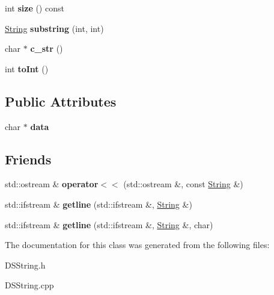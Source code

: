 \begin{DoxyCompactItemize}
\item 
int {\bfseries size} () const \hypertarget{classString_a6f35d53ffdc2ff4336dcb775d5d636df}{}\label{classString_a6f35d53ffdc2ff4336dcb775d5d636df}

\item 
\hyperlink{classString}{String} {\bfseries substring} (int, int)\hypertarget{classString_a0f6fb19e6af4f970864c098319368b4e}{}\label{classString_a0f6fb19e6af4f970864c098319368b4e}

\item 
char $\ast$ {\bfseries c\+\_\+str} ()\hypertarget{classString_aefb74cf401b56191337867e2780c5286}{}\label{classString_aefb74cf401b56191337867e2780c5286}

\item 
int {\bfseries to\+Int} ()\hypertarget{classString_a77ce12d84388f4e13f79ba806dd0e590}{}\label{classString_a77ce12d84388f4e13f79ba806dd0e590}

\end{DoxyCompactItemize}
\subsection*{Public Attributes}
\begin{DoxyCompactItemize}
\item 
char $\ast$ {\bfseries data}\hypertarget{classString_aac3cd44be218d486e9fe9ecb08662752}{}\label{classString_aac3cd44be218d486e9fe9ecb08662752}

\end{DoxyCompactItemize}
\subsection*{Friends}
\begin{DoxyCompactItemize}
\item 
std\+::ostream \& {\bfseries operator$<$$<$} (std\+::ostream \&, const \hyperlink{classString}{String} \&)\hypertarget{classString_a18332672ad6e721a4db7f99456539719}{}\label{classString_a18332672ad6e721a4db7f99456539719}

\item 
std\+::ifstream \& {\bfseries getline} (std\+::ifstream \&, \hyperlink{classString}{String} \&)\hypertarget{classString_ad871eb5204daf5c1b12cfa8d59afdeea}{}\label{classString_ad871eb5204daf5c1b12cfa8d59afdeea}

\item 
std\+::ifstream \& {\bfseries getline} (std\+::ifstream \&, \hyperlink{classString}{String} \&, char)\hypertarget{classString_ae79aebe0ca1295c1a08f6ce73a866f66}{}\label{classString_ae79aebe0ca1295c1a08f6ce73a866f66}

\end{DoxyCompactItemize}


The documentation for this class was generated from the following files\+:\begin{DoxyCompactItemize}
\item 
D\+S\+String.\+h\item 
D\+S\+String.\+cpp\end{DoxyCompactItemize}
